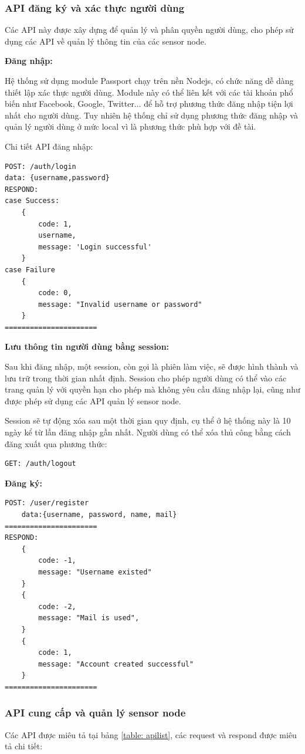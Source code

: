 \subsubsection*{API đăng ký và xác thực người dùng}

Các API này được xây dựng để quản lý và phân quyền người dùng, cho phép sử dụng các API về quản lý thông tin của các sensor node.

\textbf{Đăng nhập:}

Hệ thống sử dụng module Passport chạy trên nền Nodejs, có chức năng dễ dàng thiết lập xác thực người dùng. Module này có thể liên kết với các tài khoản phổ biến như Facebook, Google, Twitter... để hỗ trợ phương thức đăng nhập tiện lợi nhất cho người dùng. Tuy nhiên hệ thống chỉ sử dụng phương thức đăng nhập và quản lý người dùng ở mức local vì là phương thức phù hợp với đề tài.

Chi tiết API đăng nhập:
\begin{Verbatim}[xleftmargin=2em]
POST: /auth/login
data: {username,password}
RESPOND:
case Success:
	{
		code: 1,
		username,
		message: 'Login successful'
	}
case Failure	
	{
		code: 0,
		message: "Invalid username or password"
	}
======================
\end{Verbatim}

\textbf{Lưu thông tin người dùng bằng session:}

Sau khi đăng nhập, một session, còn gọi là phiên làm việc, sẽ được hình thành và lưu trữ trong thời gian nhất định. Session cho phép người dùng có thể vào các trang quản lý với quyền hạn cho phép mà không yêu cầu đăng nhập lại, cũng như được phép sử dụng các API quản lý sensor node.

Session sẽ tự động xóa sau một thời gian quy định, cụ thể ở hệ thống này là 10 ngày kể từ lần đăng nhập gần nhất. Người dùng có thể xóa thủ công bằng cách đăng xuất qua phương thức:
\begin{Verbatim}[xleftmargin=2em]
GET: /auth/logout
\end{Verbatim}

\textbf{Đăng ký:}

\begin{Verbatim}[xleftmargin=2em]
POST: /user/register
	data:{username, password, name, mail}
======================	
RESPOND:
	{
		code: -1,
		message: "Username existed"
	}
	{
		code: -2,
		message: "Mail is used",
	}
	{
		code: 1,
		message: "Account created successful"
	}
======================	
\end{Verbatim}
\subsubsection*{API cung cấp và quản lý sensor node}
Các API được miêu tả tại bảng \ref{table: apilist}, các request và respond được miêu tả chi tiết:

